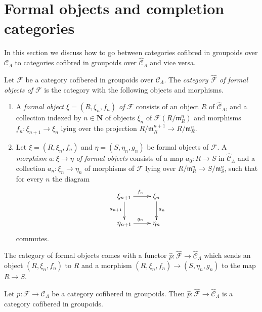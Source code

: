 \section{Formal objects and completion categories}
\label{section-formal-objects}

\noindent
In this section we discuss how to go between categories cofibred in
groupoids over $\mathcal{C}_\Lambda$ to categories cofibred in
groupoids over $\widehat{\mathcal{C}}_\Lambda$ and vice versa.

\begin{definition}
\label{definition-formal-objects}
Let $\mathcal{F}$ be a category cofibered in groupoids over
$\mathcal{C}_\Lambda$. The {\it category $\widehat{\mathcal{F}}$ of formal
objects of  $\mathcal{F}$} is the category with the following objects and
morphisms.
\begin{enumerate}
\item A {\it formal object $\xi = (R, \xi_n, f_n)$ of $\mathcal{F}$} 
consists of an object $R$ of $\widehat{\mathcal{C}}_\Lambda$, and a collection 
indexed by $n \in \mathbf{N}$ of objects $\xi_{n}$ of
$\mathcal{F}(R/\mathfrak m_R^n)$ and morphisms
$f_n : \xi_{n + 1} \to \xi_n$ lying over the projection
$R/\mathfrak m_R^{n + 1} \to R/\mathfrak m_R^n$.
\item Let $\xi = (R, \xi_n, f_n)$ and $\eta = (S, \eta_n, g_n)$ be 
formal objects of $\mathcal{F}$.  A {\it morphism $a: \xi \to \eta$ of 
formal objects} consists of a map $a_0 : R \to S$ in
$\widehat{\mathcal{C}}_\Lambda$ and a collection $a_n : \xi_n \to \eta_n$
of morphisms of $\mathcal{F}$ lying over
$R/\mathfrak{m}_R^n \to S/\mathfrak{m}_S^n$, 
such that for every $n$ the diagram
$$
\xymatrix{
\xi_{n + 1} \ar[r]^{f_n} \ar[d]_{a_{n + 1}} & \xi_n \ar[d]^{a_n} \\
\eta_{n + 1} \ar[r]^{g_n} & \eta_n
}
$$
commutes.
\end{enumerate}
\end{definition}

\noindent
The category of formal objects comes with a functor $\widehat{p}: 
\widehat{\mathcal{F}} \to \widehat{\mathcal{C}}_\Lambda$ which sends an 
object $(R,\xi_n,f_n)$ to $R$ and a morphism $(R,\xi_n,f_n) \to 
(S,\eta_n,g_n)$ to the map $R \to S$.

\begin{lemma}
\label{lemma-completion-cofibred}
Let $p: \mathcal{F} \to \mathcal{C}_\Lambda$ be a category cofibered in 
groupoids.  Then $\widehat{p}: \widehat{\mathcal{F}} \to 
\widehat{\mathcal{C}}_\Lambda$ is a category cofibered in groupoids.
\end{lemma}

